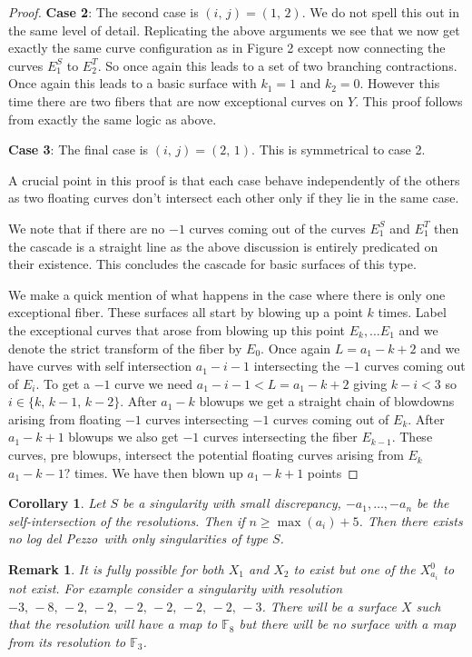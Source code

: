 \documentclass[12pt]{amsbook}
\theoremstyle{plain}
\newtheorem{cor}[thm]{Corollary}
\newtheorem*{rem}{Remark}
\newcommand{\ldp}{log del Pezzo}
\newcommand{\mb}[1]{\mathbb{#1}}
\begin{document}
\begin{proof}
\textbf{Case 2}: The second case is $(i, \, j) = (1, \, 2)$. We do not spell this out in the same level of detail. Replicating the above arguments we see that we now get exactly the same curve configuration as in Figure 2 except now connecting the curves $E_1^S$ to $E_2^T$. So once again this leads to a set of two branching contractions. Once again this leads to a basic surface with $k_1 = 1$ and $k_2 = 0$. However this time there are two fibers that are now exceptional curves on $Y$. This proof follows from exactly the same logic as above.

\textbf{Case 3}: The final case is $(i, \, j) = (2, \, 1)$. This is symmetrical to case 2.

A crucial point in this proof is that each case behave independently of the others as two floating curves don't intersect each other only if they lie in the same case.

We note that if there are no $-1$ curves coming out of the curves $E_1^S$ and $E_1^T$ then the cascade is a straight line as the above discussion is entirely predicated on their existence. This concludes the cascade for basic surfaces of this type. 

We make a quick mention of what happens in the case where there is only one exceptional fiber. These surfaces all start by blowing up a point $k$ times. Label the exceptional curves that arose from blowing up this point $E_{k}, \dots E_1$ and we denote the strict transform of the fiber by $E_{0}$. Once again $L = a_1 -k+ 2$ and we have curves with self intersection $a_1 - i -1$ intersecting the $-1$ curves coming out of $E_i$. To get a $-1$ curve we need $a_1 - i - 1 < L = a_1 - k+2$ giving $k-i < 3$ so $i \in \{ k, \, k-1,\, k-2 \}$.  After $a_1-k$ blowups we get a straight chain of blowdowns arising from floating $-1$ curves intersecting $-1$ curves coming out of $E_k$. After $a_1-k+1$ blowups we also get $-1$ curves intersecting the fiber $E_{k-1}$. These curves, pre blowups, intersect the potential floating curves arising from $E_k$ $a_1 - k - 1?$ times. We have then blown up $a_1-k+1$ points 


\end{proof}
\begin{cor}
Let $S$ be a singularity with small discrepancy, $-a_1, \dots , -a_n$ be the self-intersection of the resolutions. Then if $n \geq \max (a_i) + 5 $. Then there exists no \ldp\ with only singularities of type $S$.
\end{cor}
\begin{rem}
It is fully possible for both $X_1$ and $X_2$ to exist but one of the $X_{a_i}^0$ to not exist. For example consider a singularity with resolution $-3, \, -8, \, -2, \, -2, \, -2, \, -2, \, -2, \, -2, \, -3$. There will be a surface $X$ such that the resolution will have a map to $\mb{F}_8$ but there will be no surface with a map from its resolution to $\mb{F}_3$.
\end{rem}
\end{document}

